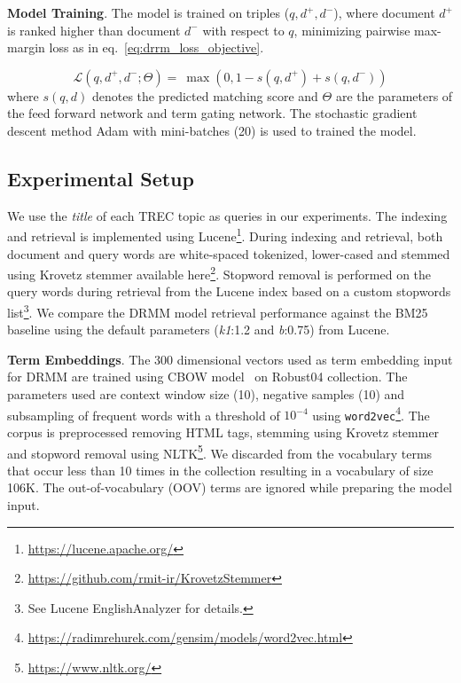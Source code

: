 \textbf{Model Training}. The model is trained on triples ($q, d^+, d^-$), where document $d^+$ is ranked higher than document $d^-$ with respect to $q$, minimizing pairwise max-margin loss as in eq.~\ref{eq:drrm_loss_objective}.

\begin{equation}\label{eq:drrm_loss_objective}
    \mathcal{L}(q,d^+,d^-;\Theta) = \
    {\max (0, 1 - s(q,d^+) + s(q,d^-))}
\end{equation}
where $s(q,d)$ denotes the predicted matching score and $\Theta$ are the parameters of the feed forward network and term gating network. The stochastic gradient descent method \textsf{Adam} with mini-batches (20) is used to trained the model.


\subsection{Experimental Setup}\label{drmm_exp_setup}
We use the \textit{title} of each TREC topic as queries in our experiments. The indexing and retrieval is implemented using Lucene\footnote{\url{https://lucene.apache.org/}}. During indexing and retrieval, both document and query words are white-spaced tokenized, lower-cased and stemmed using Krovetz stemmer available here\footnote{\url{https://github.com/rmit-ir/KrovetzStemmer}}. Stopword removal is performed on the query words during retrieval from the Lucene index based on a custom stopwords list\footnote{See Lucene \textsf{EnglishAnalyzer} for details.}. We compare the DRMM model retrieval performance against the BM25 baseline using the default parameters (\textit{k1}:1.2 and \textit{b}:0.75) from Lucene.

\textbf{Term Embeddings}. The 300 dimensional vectors used as term embedding input for DRMM are trained using CBOW model~\citep{Mikolov2013} on Robust04 collection. The parameters used are context window size (10), negative samples (10) and subsampling of frequent words with a threshold of $10^{-4}$ using \texttt{word2vec}\footnote{\url{https://radimrehurek.com/gensim/models/word2vec.html}}. The corpus is preprocessed removing HTML tags, stemming using Krovetz stemmer and stopword removal using NLTK\footnote{\url{https://www.nltk.org/}}. We discarded from the vocabulary terms that occur less than 10 times in the collection resulting in a vocabulary of size 106K. The out-of-vocabulary (OOV) terms are ignored while preparing the model input.


